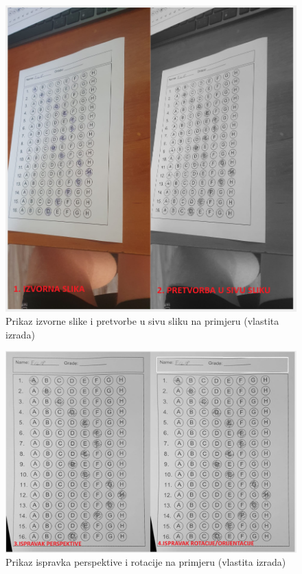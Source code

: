 \documentclass{foi}
\begin{document}
\begin{figure}[H]
\centering
\includegraphics[width=0.85\linewidth]{slike/null (7).png}
\caption{Prikaz izvorne slike i pretvorbe u sivu sliku na primjeru (vlastita izrada)}
\end{figure}

\begin{figure}[H]
\centering
\includegraphics[width=0.85\linewidth]{slike/null (8).png}
\caption{Prikaz ispravka perspektive i rotacije na primjeru (vlastita izrada)}
\end{figure}
\end{document}
